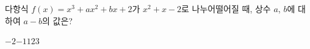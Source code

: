 다항식 $f(x)=x^3+ax^2+bx+2$가 $x^2+x-2$로 나누어떨어질 때, 상수 $a$, $b$에 대하여 $a-b$의 값은?
\begin{choices32}{$-2$}{$-1$}{$1$}{$2$}{$3$}\end{choices32}
